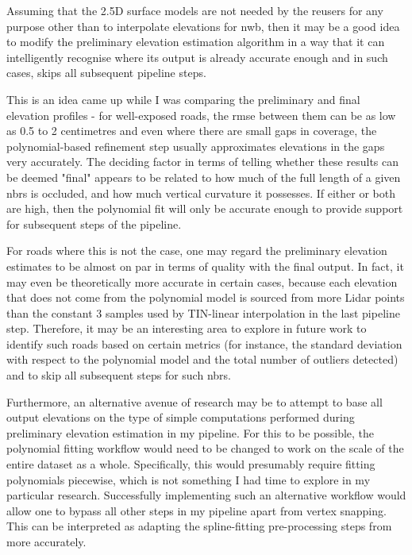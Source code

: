 Assuming that the 2.5D surface models are not needed by the reusers for any purpose other than to interpolate elevations for \ac{nwb}, then it may be a good idea to modify the preliminary elevation estimation algorithm in a way that it can intelligently recognise where its output is already accurate enough and in such cases, skips all subsequent pipeline steps.

This is an idea came up while I was comparing the preliminary and final elevation profiles - for well-exposed roads, the \ac{rmse} between them can be as low as 0.5 to 2 centimetres and even where there are small gaps in coverage, the polynomial-based refinement step usually approximates elevations in the gaps very accurately. The deciding factor in terms of telling whether these results can be deemed "final" appears to be related to how much of the full length of a given \ac{nbrs} is occluded, and how much vertical curvature it possesses. If either or both are high, then the polynomial fit will only be accurate enough to provide support for subsequent steps of the pipeline.

For roads where this is not the case, one may regard the preliminary elevation estimates to be almost on par in terms of quality with the final output. In fact, it may even be theoretically more accurate in certain cases, because each elevation that does not come from the polynomial model is sourced from more Lidar points than the constant 3 samples used by TIN-linear interpolation in the last pipeline step. Therefore, it may be an interesting area to explore in future work to identify such roads based on certain metrics (for instance, the standard deviation with respect to the polynomial model and the total number of outliers detected) and to skip all subsequent steps for such \ac{nbrs}.

Furthermore, an alternative avenue of research may be to attempt to base all output elevations on the type of simple computations performed during preliminary elevation estimation in my pipeline. For this to be possible, the polynomial fitting workflow would need to be changed to work on the scale of the entire dataset as a whole. Specifically, this would presumably require fitting polynomials piecewise, which is not something I had time to explore in my particular research. Successfully implementing such an alternative workflow would allow one to bypass all other steps in my pipeline apart from vertex snapping. This can be interpreted as adapting the spline-fitting pre-processing steps from \cite{boyko_funkhauser_2011} more accurately.

